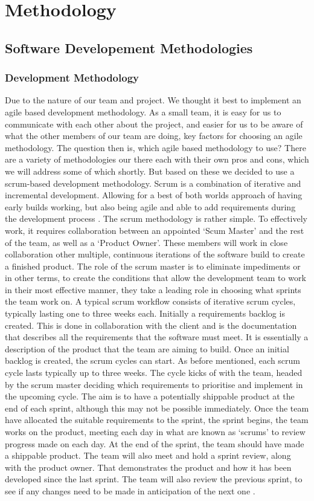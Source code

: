 \chapter{Methodology} \label{ch:methodology}
    \section{Software Developement Methodologies}
    \subsection{Development Methodology}
Due to the nature of our team and project. We thought it best to implement an agile based development methodology. As a small team, it is easy for us to communicate with each other about the project, and easier for us to be aware of what the other members of our team are doing, key factors for choosing an agile methodology.
The question then is, which agile based methodology to use? There are a variety of methodologies our there each with their own pros and cons, which we will address some of which shortly. But based on these we decided to use a scrum-based development methodology. Scrum is a combination of iterative and incremental development. Allowing for a best of both worlds approach of having early builds working, but also being agile and able to add requirements during the development process \cite{srivastava_2017_scrum}. 
The scrum methodology is rather simple. To effectively work, it requires collaboration between an appointed ‘Scum Master’ and the rest of the team, as well as a ‘Product Owner’. These members will work in close collaboration other multiple, continuous iterations of the software build to create a finished product. The role of the scrum master is to eliminate impediments \cite{srivastava_2017_scrum}or in other terms, to create the conditions that allow the development team to work in their most effective manner, they take a leading role in choosing what sprints the team work on. 
A typical scrum workflow consists of iterative scrum cycles, typically lasting one to three weeks each. Initially a requirements backlog is created.  This is done in collaboration with the client and is the documentation that describes all the requirements that the software must meet. It is essentially a description of the product that the team are aiming to build. Once an initial backlog is created, the scrum cycles can start. As before mentioned, each scrum cycle lasts typically up to three weeks. The cycle kicks of with the team, headed by the scrum master deciding which requirements to prioritise and implement in the upcoming cycle. The aim is to have a potentially shippable product at the end of each sprint, although this may not be possible immediately. Once the team have allocated the suitable requirements to the sprint, the sprint begins, the team works on the product, meeting each day in what are known as ‘scrums’ to review progress made on each day. At the end of the sprint, the team should have made a shippable product. The team will also meet and hold a sprint review, along with the product owner. That demonstrates the product and how it has been developed since the last sprint. The team will also review the previous sprint, to see if any changes need to be made in anticipation of the next one \cite{nuevo_2011_scrumbased}.
